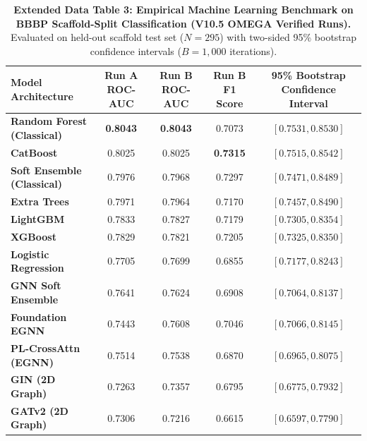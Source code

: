 \documentclass[11pt,a4paper]{article}
\begin{document}
\begin{table}[h!]
\caption{\textbf{Extended Data Table 3: Empirical Machine Learning Benchmark on BBBP Scaffold-Split Classification (V10.5 OMEGA Verified Runs).} Evaluated on held-out scaffold test set ($N=295$) with two-sided 95\% bootstrap confidence intervals ($B=1,000$ iterations).}
\label{tab:ed_bbbp}
\centering
\small
\begin{tabular}{lcccc}
\toprule
\textbf{Model Architecture} & \textbf{Run A ROC-AUC} & \textbf{Run B ROC-AUC} & \textbf{Run B F1 Score} & \textbf{95\% Bootstrap Confidence Interval} \\
\midrule
\textbf{Random Forest (Classical)} & \textbf{0.8043} & \textbf{0.8043} & 0.7073 & $[0.7531, 0.8530]$ \\
\textbf{CatBoost} & 0.8025 & 0.8025 & \textbf{0.7315} & $[0.7515, 0.8542]$ \\
\textbf{Soft Ensemble (Classical)} & 0.7976 & 0.7968 & 0.7297 & $[0.7471, 0.8489]$ \\
\textbf{Extra Trees} & 0.7971 & 0.7964 & 0.7170 & $[0.7457, 0.8490]$ \\
\textbf{LightGBM} & 0.7833 & 0.7827 & 0.7179 & $[0.7305, 0.8354]$ \\
\textbf{XGBoost} & 0.7829 & 0.7821 & 0.7205 & $[0.7325, 0.8350]$ \\
\textbf{Logistic Regression} & 0.7705 & 0.7699 & 0.6855 & $[0.7177, 0.8243]$ \\
\textbf{GNN Soft Ensemble} & 0.7641 & 0.7624 & 0.6908 & $[0.7064, 0.8137]$ \\
\textbf{Foundation EGNN} & 0.7443 & 0.7608 & 0.7046 & $[0.7066, 0.8145]$ \\
\textbf{PL-CrossAttn (EGNN)} & 0.7514 & 0.7538 & 0.6870 & $[0.6965, 0.8075]$ \\
\textbf{GIN (2D Graph)} & 0.7263 & 0.7357 & 0.6795 & $[0.6775, 0.7932]$ \\
\textbf{GATv2 (2D Graph)} & 0.7306 & 0.7216 & 0.6615 & $[0.6597, 0.7790]$ \\
\bottomrule
\end{tabular}
\end{table}

\vspace{1em}
\end{document}
